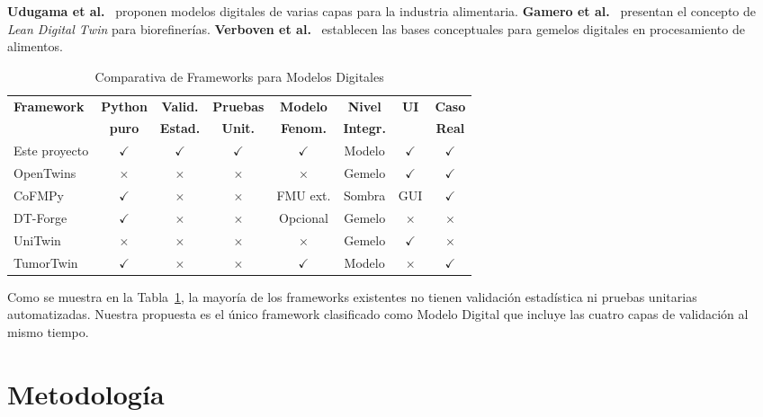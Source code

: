 \documentclass[10pt,letterpaper]{article}
\begin{document}
\textbf{Udugama et al.}~\cite{udugama2023digital} proponen modelos digitales de varias capas para la industria alimentaria. \textbf{Gamero et al.}~\cite{gamero2024data} presentan el concepto de \textit{Lean Digital Twin} para biorefiner\'ias. \textbf{Verboven et al.}~\cite{verboven2020digital} establecen las bases conceptuales para gemelos digitales en procesamiento de alimentos.

\begin{table}[!ht]
\centering
\caption{Comparativa de Frameworks para Modelos Digitales}
\label{tab:comparativa}
\small
\begin{tabular}{lccccccc}
\toprule
\textbf{Framework} & \textbf{Python} & \textbf{Valid.} & \textbf{Pruebas} & \textbf{Modelo} & \textbf{Nivel} & \textbf{UI} & \textbf{Caso} \\
 & \textbf{puro} & \textbf{Estad.} & \textbf{Unit.} & \textbf{Fenom.} & \textbf{Integr.} & & \textbf{Real} \\
\midrule
Este proyecto & $\checkmark$ & $\checkmark$ & $\checkmark$ & $\checkmark$ & Modelo & $\checkmark$ & $\checkmark$ \\
OpenTwins~\cite{robles2023opentwins} & $\times$ & $\times$ & $\times$ & $\times$ & Gemelo & $\checkmark$ & $\checkmark$ \\
CoFMPy~\cite{friedrich2025cofmupy} & $\checkmark$ & $\times$ & $\times$ & FMU ext. & Sombra & GUI & $\checkmark$ \\
DT-Forge~\cite{dtforge2025} & $\checkmark$ & $\times$ & $\times$ & Opcional & Gemelo & $\times$ & $\times$ \\
UniTwin~\cite{haussermann2024unitwin} & $\times$ & $\times$ & $\times$ & $\times$ & Gemelo & $\checkmark$ & $\times$ \\
TumorTwin~\cite{tumortwin2025} & $\checkmark$ & $\times$ & $\times$ & $\checkmark$ & Modelo & $\times$ & $\checkmark$ \\
\bottomrule
\end{tabular}
\end{table}

Como se muestra en la Tabla~\ref{tab:comparativa}, la mayor\'ia de los frameworks existentes no tienen validaci\'on estad\'istica ni pruebas unitarias automatizadas. Nuestra propuesta es el \'unico framework clasificado como Modelo Digital que incluye las cuatro capas de validaci\'on al mismo tiempo.

\section{Metodolog\'ia}
\end{document}
